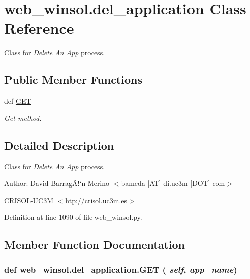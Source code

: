 \hypertarget{classweb__winsol_1_1del__application}{
\section{web\_\-winsol.del\_\-application Class Reference}
\label{classweb__winsol_1_1del__application}
}
Class for {\em Delete\/} {\em An\/} {\em App\/} process.  


\subsection*{Public Member Functions}
\begin{CompactItemize}
\item 
def \hyperlink{classweb__winsol_1_1del__application_2d95e9a60269dc6e2e086b3495d96973}{GET}
\begin{CompactList}\small\item\em Get method. \item\end{CompactList}\end{CompactItemize}


\subsection{Detailed Description}
Class for {\em Delete\/} {\em An\/} {\em App\/} process. 

\begin{Desc}
\item[Author:]David Barrag\~{A}!`n Merino $<$bameda \mbox{[}AT\mbox{]} di.uc3m \mbox{[}DOT\mbox{]} com$>$ 

CRISOL-UC3M $<$htp://crisol.uc3m.es$>$ \end{Desc}




Definition at line 1090 of file web\_\-winsol.py.

\subsection{Member Function Documentation}
\hypertarget{classweb__winsol_1_1del__application_2d95e9a60269dc6e2e086b3495d96973}{
\subsubsection[GET]{\setlength{\rightskip}{0pt plus 5cm}def web\_\-winsol.del\_\-application.GET ( {\em self},  {\em app\_\-name})}}
\label{classweb__winsol_1_1del__application_2d95e9a60269dc6e2e086b3495d96973}


